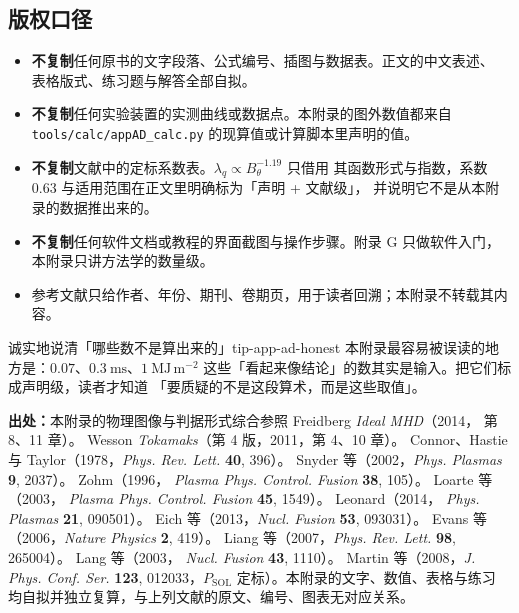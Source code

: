 \subsection*{版权口径}


\begin{itemize}
\item \textbf{不复制}任何原书的文字段落、公式编号、插图与数据表。正文的中文表述、
表格版式、练习题与解答全部自拟。
\item \textbf{不复制}任何实验装置的实测曲线或数据点。本附录的图外数值都来自
\texttt{tools/\allowbreak{}calc/\allowbreak{}appAD\_calc.py} 的现算值或计算脚本里声明的值。
\item \textbf{不复制}文献中的定标系数表。$\lambda_q\propto B_\theta^{-1.19}$ 只借用
其函数形式与指数，系数 $0.63$ 与适用范围在正文里明确标为「声明 + 文献级」，
并说明它不是从本附录的数据推出来的。
\item \textbf{不复制}任何软件文档或教程的界面截图与操作步骤。附录 G 只做软件入门，
本附录只讲方法学的数量级。
\item 参考文献只给作者、年份、期刊、卷期页，用于读者回溯；本附录不转载其内容。

\end{itemize}

\begin{tip}{诚实地说清「哪些数不是算出来的」}{tip-app-ad-honest}
本附录最容易被误读的地方是：$0.07$、$0.3\ \mathrm{ms}$、$1\ \mathrm{MJ\,m^{-2}}$
这些「看起来像结论」的数其实是输入。把它们标成声明级，读者才知道
「要质疑的不是这段算术，而是这些取值」。
\end{tip}

\textbf{出处：}本附录的物理图像与判据形式综合参照 Freidberg \emph{Ideal MHD}（2014，
第 8、11 章）。
Wesson \emph{Tokamaks}（第 4 版，2011，第 4、10 章）。
Connor、Hastie 与 Taylor（1978，\emph{Phys. Rev. Lett.} \textbf{40}, 396）。
Snyder 等（2002，\emph{Phys. Plasmas} \textbf{9}, 2037）。
Zohm（1996，
\emph{Plasma Phys. Control. Fusion} \textbf{38}, 105）。
Loarte 等（2003，
\emph{Plasma Phys. Control. Fusion} \textbf{45}, 1549）。
Leonard（2014，
\emph{Phys. Plasmas} \textbf{21}, 090501）。
Eich 等（2013，\emph{Nucl. Fusion}
\textbf{53}, 093031）。
Evans 等（2006，\emph{Nature Physics} \textbf{2}, 419）。
Liang 等（2007，\emph{Phys. Rev. Lett.} \textbf{98}, 265004）。
Lang 等（2003，
\emph{Nucl. Fusion} \textbf{43}, 1110）。
Martin 等（2008，\emph{J. Phys. Conf. Ser.}
\textbf{123}, 012033，$P_{\mathrm{SOL}}$ 定标）。本附录的文字、数值、表格与练习
均自拟并独立复算，与上列文献的原文、编号、图表无对应关系。
\endgroup
